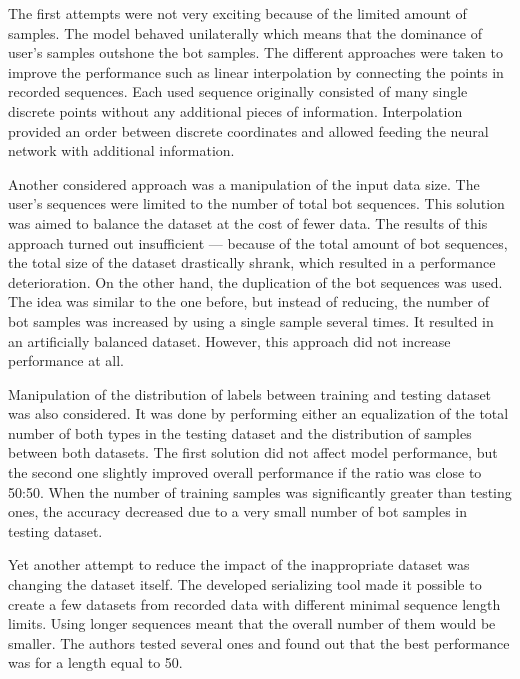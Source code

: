 The first attempts were not very exciting because of the limited amount of samples.
The model behaved unilaterally which means that the dominance of user's samples outshone the bot samples.
The different approaches were taken to improve the performance such as linear interpolation by connecting the points in recorded sequences.
Each used sequence originally consisted of many single discrete points without any additional pieces of information.
Interpolation provided an order between discrete coordinates and allowed feeding the neural network with additional information.

Another considered approach was a manipulation of the input data size.
The user's sequences were limited to the number of total bot sequences.
This solution was aimed to balance the dataset at the cost of fewer data.
The results of this approach turned out insufficient --- because of the total amount of bot sequences, the total size of the dataset drastically shrank, which resulted in a performance deterioration.
On the other hand, the duplication of the bot sequences was used.
The idea was similar to the one before, but instead of reducing, the number of bot samples was increased by using a single sample several times.
It resulted in an artificially balanced dataset.
However, this approach did not increase performance at all.

Manipulation of the distribution of labels between training and testing dataset was also considered.
It was done by performing either an equalization of the total number of both types in the testing dataset and the distribution of samples between both datasets.
The first solution did not affect model performance, but the second one slightly improved overall performance if the ratio was close to 50:50.
When the number of training samples was significantly greater than testing ones, the accuracy decreased due to a very small number of bot samples in testing dataset.

Yet another attempt to reduce the impact of the inappropriate dataset was changing the dataset itself.
The developed serializing tool made it possible to create a few datasets from recorded data with different minimal sequence length limits.
Using longer sequences meant that the overall number of them would be smaller.
The authors tested several ones and found out that the best performance was for a length equal to 50.

